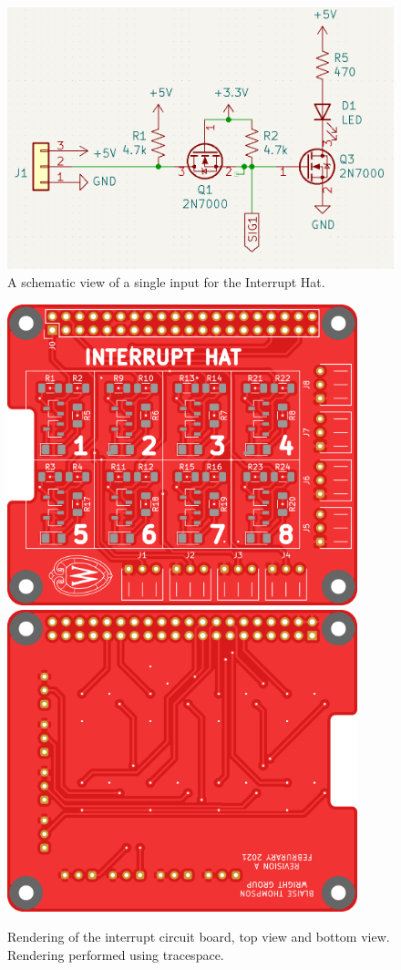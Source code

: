 \begin{figure}
	\includegraphics[width=5in]{opa400/images/interrupt_schematic}
\caption[Interrupt Hat Schematic]{
	A schematic view of a single input for the Interrupt Hat.
}
\label{opa4:fig:interrupt_schematic}
\end{figure}


\begin{figure}
	\includegraphics[width=4in]{opa400/images/interrupt_top}
	\includegraphics[width=4in]{opa400/images/interrupt_bottom}
\caption[Interrupt Hat Circuit Board]{
Rendering of the interrupt circuit board, top view and bottom view.
Rendering performed using tracespace\cite{}.
}
\label{opa4:fig:interrupt_board}
\end{figure}

